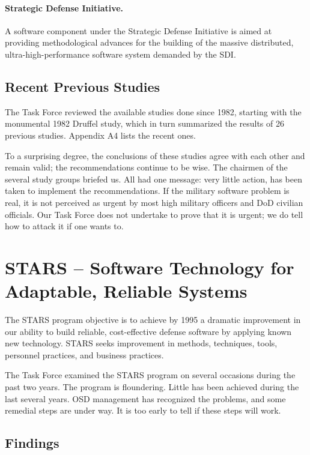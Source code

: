 \documentclass[12pt]{article}
\begin{document}
\paragraph{Strategic Defense Initiative.} A software component under the
Strategic Defense Initiative is aimed at providing methodological advances for
the building of the massive distributed, ultra-high-performance software system
demanded by the SDI.

\subsection{Recent Previous Studies}

The Task Force reviewed the available studies done since 1982, starting with
the monumental 1982 Druffel study, which in turn summarized the results of 26
previous studies. Appendix A4 lists the recent ones.

To a surprising degree, the conclusions of these studies agree with each other
and remain valid; the recommendations continue to be wise. The chairmen of the
several study groups briefed us. All had one message: very little action, has
been taken to implement the recommendations. If the military software problem
is real, it is not perceived as urgent by most high military officers and DoD
civilian officials. Our Task Force does not undertake to prove that it is
urgent; we do tell how to attack it if one wants to.

\section{STARS -- Software Technology for Adaptable, Reliable Systems}

The STARS program objective is to achieve by 1995 a dramatic improvement in our
ability to build reliable, cost-effective defense software by applying known
new technology.  STARS seeks improvement in methods, techniques, tools,
personnel practices, and business practices.

The Task Force examined the STARS program on several occasions during the past
two years. The program is floundering. Little has been achieved during the last
several years. OSD management has recognized the problems, and some remedial
steps are under way. It is too early to tell if these steps will work.

\subsection*{Findings}
\end{document}
